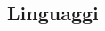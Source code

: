 \documentclass[10pt]{article} %
\begin{document}
\begin{paracol}{2}
%
%
%
%
%
%
%	
%	
%	
%	
%	
%	
%


\section{Linguaggi}





\end{paracol}
\end{document}
